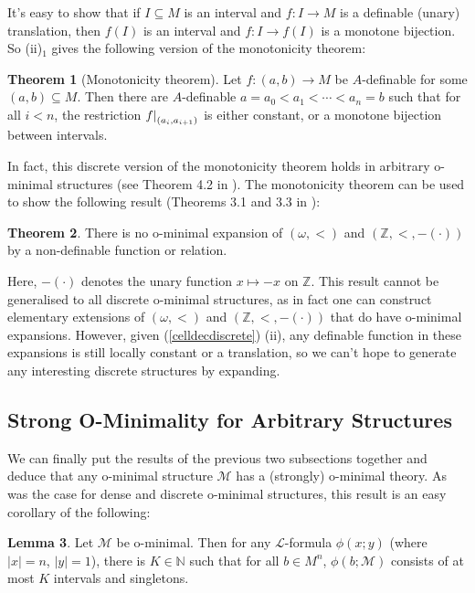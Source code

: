 \documentclass[a4paper]{report}
\newcommand{\ind}{\hspace{15pt}}
\newcommand{\Nat}{\mathbb{N}}
\newcommand{\Z}{\mathbb{Z}}
\renewcommand{\L}{\mathcal{L}}
\newcommand{\M}{\mathcal{M}}
\newcommand\restr[2]{{\left.\kern-\nulldelimiterspace#1\right|_{#2}}}
\theoremstyle{definition}
\newtheorem{thm}{Theorem}[chapter]
\newtheorem{lem}[thm]{Lemma}
\theoremstyle{remstyle}
\begin{document}
\ind It's easy to show that if $I\subseteq M$ is an interval and $f:I\to M$ is a definable (unary) translation, then $f(I)$ is an interval and $f:I\to f(I)$ is a monotone bijection. So (ii)$_1$ gives the following version of the monotonicity theorem:

\begin{thm}[Monotonicity theorem]\label{monod}
	Let $f:(a,b)\to M$ be $A$-definable for some $(a,b)\subseteq M$. Then there are $A$-definable $a=a_0<a_1<\cdots<a_n=b$ such that for all $i<n$, the restriction $\restr{f}{(a_i,a_{i+1})}$ is either constant, or a monotone bijection between intervals.
\end{thm}

\ind In fact, this discrete version of the monotonicity theorem holds in arbitrary o-minimal structures (see Theorem 4.2 in \cite{defI}). The monotonicity theorem can be used to show the following result (Theorems 3.1 and 3.3 in \cite{discrete}):

\begin{thm}
	There is no o-minimal expansion of $(\omega,<)$ and $(\Z,<,-(\cdot))$ by a non-definable function or relation.
\end{thm}

\ind Here, $-(\cdot)$ denotes the unary function $x\mapsto -x$ on $\Z$. This result cannot be generalised to all discrete o-minimal structures, as in fact one can construct elementary extensions of $(\omega,<)$ and $(\Z,<,-(\cdot))$ that do have o-minimal expansions. However, given (\ref{celldecdiscrete}) (ii), any definable function in these expansions is still locally constant or a translation, so we can't hope to generate any interesting discrete structures by expanding.

\subsection{Strong O-Minimality for Arbitrary Structures}

\ind We can finally put the results of the previous two subsections together and deduce that any o-minimal structure $\M$ has a (strongly) o-minimal theory. As was the case for dense and discrete o-minimal structures, this result is an easy corollary of the following:

\begin{lem}\label{mixed1}
	Let $\M$ be o-minimal. Then for any $\L$-formula $\phi(x;y)$ (where $|x|=n$, $|y|=1$), there is $K\in\Nat$ such that for all $b\in M^n$, $\phi(b;\M)$ consists of at most $K$ intervals and singletons.
\end{lem}
\end{document}
